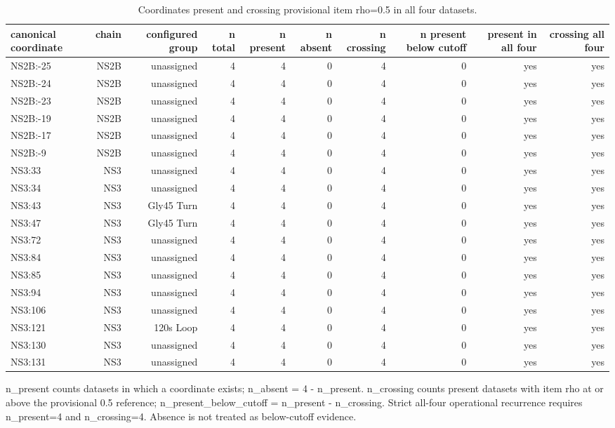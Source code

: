 \begin{table}[t]
  \centering
  \caption{Coordinates present and crossing provisional item rho=0.5 in all four datasets.}
  \label{tab:all_four_operational}
  \begin{tabular}{lrrrrrrrrr}
    \toprule
    canonical coordinate & chain & configured group & n total & n present & n absent & n crossing & n present below cutoff & present in all four & crossing all four \\
    \midrule
    NS2B:-25 & NS2B & unassigned & 4 & 4 & 0 & 4 & 0 & yes & yes \\
    NS2B:-24 & NS2B & unassigned & 4 & 4 & 0 & 4 & 0 & yes & yes \\
    NS2B:-23 & NS2B & unassigned & 4 & 4 & 0 & 4 & 0 & yes & yes \\
    NS2B:-19 & NS2B & unassigned & 4 & 4 & 0 & 4 & 0 & yes & yes \\
    NS2B:-17 & NS2B & unassigned & 4 & 4 & 0 & 4 & 0 & yes & yes \\
    NS2B:-9 & NS2B & unassigned & 4 & 4 & 0 & 4 & 0 & yes & yes \\
    NS3:33 & NS3 & unassigned & 4 & 4 & 0 & 4 & 0 & yes & yes \\
    NS3:34 & NS3 & unassigned & 4 & 4 & 0 & 4 & 0 & yes & yes \\
    NS3:43 & NS3 & Gly45 Turn & 4 & 4 & 0 & 4 & 0 & yes & yes \\
    NS3:47 & NS3 & Gly45 Turn & 4 & 4 & 0 & 4 & 0 & yes & yes \\
    NS3:72 & NS3 & unassigned & 4 & 4 & 0 & 4 & 0 & yes & yes \\
    NS3:84 & NS3 & unassigned & 4 & 4 & 0 & 4 & 0 & yes & yes \\
    NS3:85 & NS3 & unassigned & 4 & 4 & 0 & 4 & 0 & yes & yes \\
    NS3:94 & NS3 & unassigned & 4 & 4 & 0 & 4 & 0 & yes & yes \\
    NS3:106 & NS3 & unassigned & 4 & 4 & 0 & 4 & 0 & yes & yes \\
    NS3:121 & NS3 & 120s Loop & 4 & 4 & 0 & 4 & 0 & yes & yes \\
    NS3:130 & NS3 & unassigned & 4 & 4 & 0 & 4 & 0 & yes & yes \\
    NS3:131 & NS3 & unassigned & 4 & 4 & 0 & 4 & 0 & yes & yes \\
    \bottomrule
  \end{tabular}
  \par\smallskip
  \begin{minipage}{0.98\linewidth}\footnotesize
  n\_present counts datasets in which a coordinate exists; n\_absent = 4 - n\_present. n\_crossing counts present datasets with item rho at or above the provisional 0.5 reference; n\_present\_below\_cutoff = n\_present - n\_crossing. Strict all-four operational recurrence requires n\_present=4 and n\_crossing=4. Absence is not treated as below-cutoff evidence.
  \end{minipage}
\end{table}
